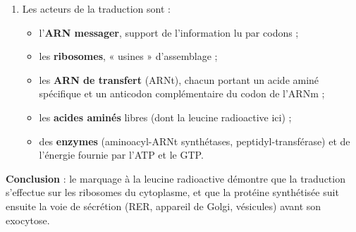 \documentclass[11pt]{article}
\begin{document}
\begin{exoresolu}
\begin{enumerate}
\begin{itemize}
\end{itemize}
Ce trajet illustre la \textbf{voie de sécrétion} : RER $\rightarrow$ Golgi $\rightarrow$ vésicules $\rightarrow$ exocytose.
\item Les acteurs de la traduction sont :
\begin{itemize}
\item l'\textbf{ARN messager}, support de l'information lu par codons ;
\item les \textbf{ribosomes}, « usines » d'assemblage ;
\item les \textbf{ARN de transfert} (ARNt), chacun portant un acide aminé spécifique et un anticodon complémentaire du codon de l'ARNm ;
\item les \textbf{acides aminés} libres (dont la leucine radioactive ici) ;
\item des \textbf{enzymes} (aminoacyl-ARNt synthétases, peptidyl-transférase) et de l'énergie fournie par l'ATP et le GTP.
\end{itemize}
\end{enumerate}
\textbf{Conclusion} : le marquage à la leucine radioactive démontre que la traduction s'effectue sur les ribosomes du cytoplasme, et que la protéine synthétisée suit ensuite la voie de sécrétion (RER, appareil de Golgi, vésicules) avant son exocytose.
\end{exoresolu}
\end{document}
